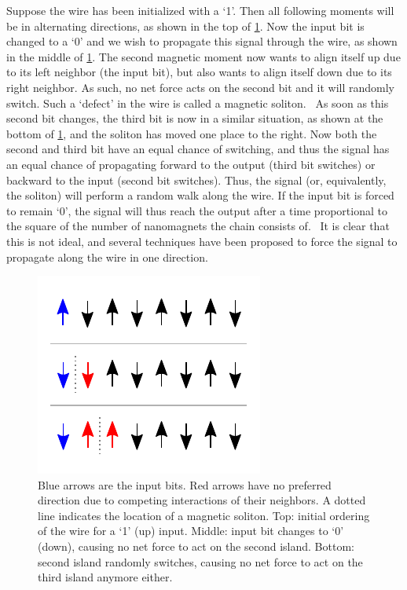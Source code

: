 \documentclass[10pt,a4paper]{article}
\begin{document}
Suppose the wire has been initialized with a `1'. Then all following moments will be in alternating directions, as shown in the top of \cref{fig:Intro_SolitonRandomWalk}. Now the input bit is changed to a `0' and we wish to propagate this signal through the wire, as shown in the middle of \cref{fig:Intro_SolitonRandomWalk}. The second magnetic moment now wants to align itself up due to its left neighbor (the input bit), but also wants to align itself down due to its right neighbor. As such, no net force acts on the second bit and it will randomly switch. Such a `defect' in the wire is called a magnetic soliton.~\cite{MQCA_RoomTemp} As soon as this second bit changes, the third bit is now in a similar situation, as shown at the bottom of \cref{fig:Intro_SolitonRandomWalk}, and the soliton has moved one place to the right. Now both the second and third bit have an equal chance of switching, and thus the signal has an equal chance of propagating forward to the output (third bit switches) or backward to the input (second bit switches). Thus, the signal (or, equivalently, the soliton) will perform a random walk along the wire. If the input bit is forced to remain `0', the signal will thus reach the output after a time proportional to the square of the number of nanomagnets the chain consists of.~\cite{Wolfram_RandomWalk} It is clear that this is not ideal, and several techniques have been proposed to force the signal to propagate along the wire in one direction. 
\begin{figure}
    \centering
    \includegraphics[width=0.5\columnwidth]{Figures/Introduction/Soliton_random_walk_2steps.pdf}
    \caption{Blue arrows are the input bits. Red arrows have no preferred direction due to competing interactions of their neighbors. A dotted line indicates the location of a magnetic soliton. Top: initial ordering of the wire for a `1' (up) input. Middle: input bit changes to `0' (down), causing no net force to act on the second island. Bottom: second island randomly switches, causing no net force to act on the third island anymore either.}
    \label{fig:Intro_SolitonRandomWalk}
\end{figure}
\end{document}
